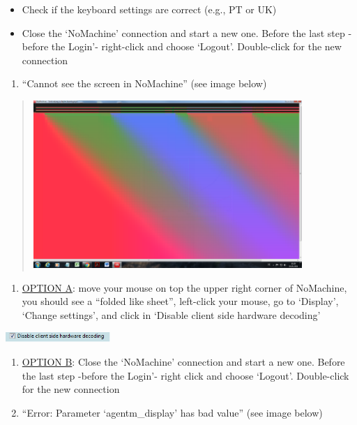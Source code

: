 \documentclass[
  11pt,
  a4paper,
]{article}
\providecommand{\tightlist}{%
  \setlength{\itemsep}{0pt}\setlength{\parskip}{0pt}}
\begin{document}
\begin{itemize}
\item
  Check if the keyboard settings are correct (e.g., PT or UK)
\item
  Close the `NoMachine' connection and start a new one. Before the last
  step -before the \textquotesingle Login'- right-click and choose
  `Logout'. Double-click for the new connection
\end{itemize}

\begin{enumerate}
\def\labelenumi{\arabic{enumi}.}
\setcounter{enumi}{3}
\tightlist
\item
  ``Cannot see the screen in NoMachine'' (see image below)
\end{enumerate}

\begin{quote}
\includegraphics[width=4.01667in,height=2.49995in]{./media/image47.png}
\end{quote}

\begin{enumerate}
\def\labelenumi{\arabic{enumi}.}
\setcounter{enumi}{4}
\tightlist
\item
  \ul{OPTION A}: move your mouse on top the upper right corner of
  NoMachine, you should see a ``folded like sheet'', left-click your
  mouse, go to `Display', `Change settings', and click in `Disable
  client side hardware decoding'
\end{enumerate}

\includegraphics[width=1.56522in,height=0.15in]{./media/image48.png}

\begin{enumerate}
\def\labelenumi{\arabic{enumi}.}
\setcounter{enumi}{5}
\item
  \ul{OPTION B}: Close the `NoMachine' connection and start a new one.
  Before the last step -before the \textquotesingle Login'- right click
  and choose `Logout'. Double-click for the new connection
\item
  ``Error: Parameter `agentm\_display' has bad value'' (see image below)
\end{enumerate}
\end{document}
